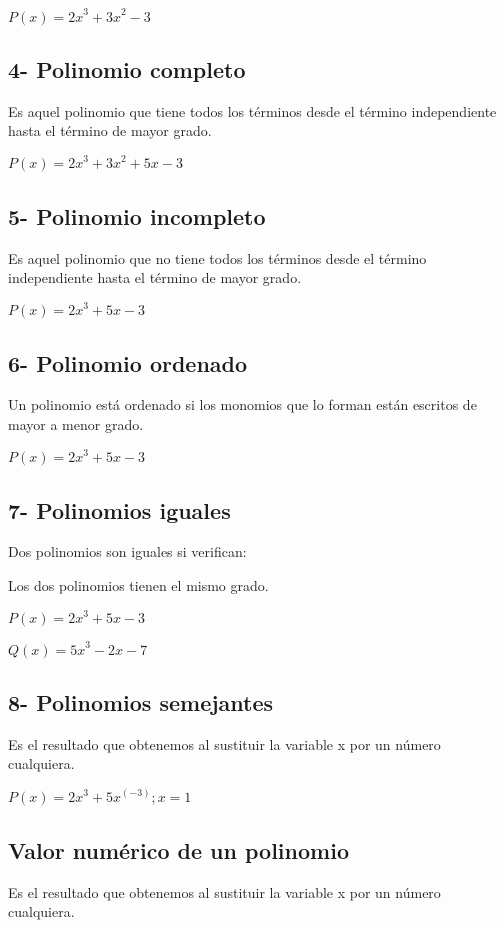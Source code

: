 \documentclass{article}
\begin{document}
 $P(x)={2x}^{3}+{3x}^{2}-3$

\subsection[4{}- Polinomio completo]{4- Polinomio completo}
Es aquel polinomio que tiene todos los t\'erminos desde el t\'ermino independiente hasta el t\'ermino de mayor grado.

 $P(x)={2x}^{3}+{3x}^{2}+5x-3$

\subsection[5{}- Polinomio incompleto]{5- Polinomio incompleto}
Es aquel polinomio que no tiene todos los t\'erminos desde el t\'ermino independiente hasta el t\'ermino de mayor grado.

 $P(x)={2x}^{3}+5x-3$

\subsection[6{}- Polinomio ordenado]{6- Polinomio ordenado}
Un polinomio est\'a ordenado si los monomios que lo forman est\'an escritos de mayor a menor grado.

 $P(x)={2x}^{3}+5x-3$

\subsection[7{}- Polinomios iguales]{7- Polinomios iguales}
Dos polinomios son iguales si verifican:

Los dos polinomios tienen el mismo grado.

 $P(x)={2x}^{3}+5x-3$

 $Q(x)={5x}^{3}-2x-7$

\subsection[8{}- Polinomios semejantes]{8- Polinomios semejantes}
Es el resultado que obtenemos al sustituir la variable x por un n\'umero cualquiera.

 $P(x)={2x}^{3}+{5x}^{(-3)};x=1$


\bigskip

\subsection[Valor num\'erico de un polinomio]{Valor num\'erico de un polinomio}
Es el resultado que obtenemos al sustituir la variable x por un n\'umero cualquiera.
\end{document}
